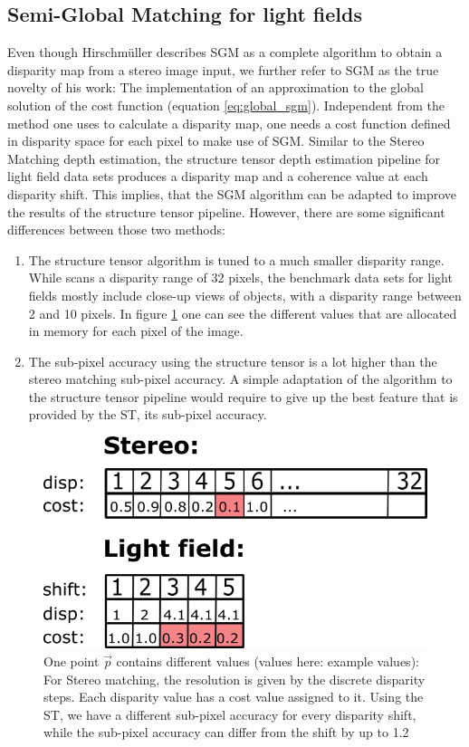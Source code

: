 \documentclass  [
  paper    = a4,
  BCOR     = 10mm,
  twoside,
  fontsize = 12pt,
  fleqn,
  toc      = bibnumbered,
  toc      = listofnumbered,
  numbers  = noendperiod,
  headings = normal,
  listof   = leveldown,
  version  = 3.03
]                                       {scrreprt}
\begin{document}
\subsection{Semi-Global Matching for light fields}
Even though Hirschmüller describes SGM as a complete algorithm to obtain a disparity map from a stereo image input, we further refer to SGM as the true novelty of his work: The implementation of an approximation to the global solution of the cost function (equation \ref{eq:global_sgm}). Independent from the method one uses to calculate a disparity map,  one needs a cost function defined in disparity space for each pixel to make use of SGM. 
Similar to the Stereo Matching depth estimation, the structure tensor depth estimation pipeline for light field data sets produces a disparity map and a coherence value at each disparity shift. This implies, that the SGM algorithm can be adapted to improve the results of the structure tensor pipeline. However, there are some significant differences between those two methods:
\begin{enumerate}
	\item The structure tensor algorithm is tuned to a much smaller disparity range. While \cite{hirschmuller2005accurate} scans a disparity range of 32 pixels, the benchmark data sets for light fields mostly include close-up views of objects, with a disparity range between 2 and 10 pixels. In figure \ref{fig:table-skizze} one can see the different values that are allocated in memory for each pixel of the image.
	\item The sub-pixel accuracy using the structure tensor is a lot higher than the stereo matching sub-pixel accuracy. A simple adaptation of the algorithm to the structure tensor pipeline would require to give up the best feature that is provided by the ST, its sub-pixel accuracy.
\end{enumerate}
\begin{figure}[h]
	\centering
	\includegraphics[width=0.7\linewidth]{images/sgm_table}
	\caption[Example values: One point $\vec p$ contains different values]{One point $\vec p$ contains different values (values here: example values): For Stereo matching, the resolution is given by the discrete disparity steps. Each disparity value has a cost value assigned to it. Using the ST, we have a different sub-pixel accuracy for every disparity shift, while the sub-pixel accuracy can differ from the shift by up to 1.2 }
	\label{fig:table-skizze}
\end{figure}
\end{document}

